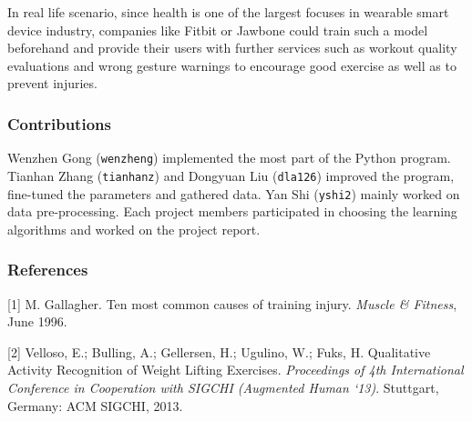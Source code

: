 \documentclass{article} %
\begin{document}
In real life scenario, since health is one of the largest focuses in wearable smart device industry, companies like Fitbit or Jawbone could train such a model beforehand and provide their users with further services such as workout quality evaluations and wrong gesture warnings to encourage good exercise as well as to prevent injuries.

\subsubsection*{Contributions}

Wenzhen Gong (\texttt{wenzheng}) implemented the most part of the Python program. Tianhan Zhang (\texttt{tianhanz}) and Dongyuan Liu (\texttt{dla126}) improved the program, fine-tuned the parameters and gathered data. Yan Shi (\texttt{yshi2}) mainly worked on data pre-processing. Each project members participated in choosing the learning algorithms and worked on the project report.

\subsubsection*{References}

\small{
[1] M. Gallagher. Ten most common causes of training injury. {\it Muscle \& Fitness}, June 1996.

[2] Velloso, E.; Bulling, A.; Gellersen, H.; Ugulino, W.; Fuks, H. Qualitative Activity Recognition of Weight Lifting Exercises. {\it Proceedings of 4th International Conference in Cooperation with SIGCHI (Augmented Human `13)}. Stuttgart, Germany: ACM SIGCHI, 2013.
}
\end{document}
